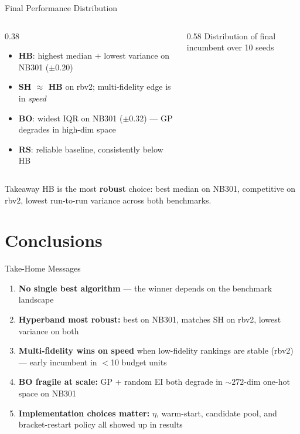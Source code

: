 \documentclass[t,english]{beamer}
\begin{document}
\begin{frame}{Final Performance Distribution}
  \begin{columns}[T]
    \begin{column}{0.38\textwidth}
      \begin{itemize}\setlength\itemsep{4pt}
        \item[\small$\blacktriangleright$] {\scriptsize\textbf{HB}: highest median + lowest variance on NB301 ($\pm 0.20$)}
        \item[\small$\blacktriangleright$] {\scriptsize\textbf{SH $\approx$ HB} on rbv2; multi-fidelity edge is in \emph{speed}}
        \item[\small$\blacktriangleright$] {\scriptsize\textbf{BO}: widest IQR on NB301 ($\pm 0.32$) — GP degrades in high-dim space}
        \item[\small$\blacktriangleright$] {\scriptsize\textbf{RS}: reliable baseline, consistently below HB}
      \end{itemize}
    \end{column}
    \begin{column}{0.58\textwidth}
      \vskip-8pt
      {\tiny Distribution of final incumbent over 10 seeds}
    \end{column}
  \end{columns}
  \vspace{0.3em}
  \begin{alertblock}{Takeaway}
    \small HB is the most \textbf{robust} choice: best median on NB301,
    competitive on rbv2, lowest run-to-run variance across both benchmarks.
  \end{alertblock}
\end{frame}

\section{Conclusions}

\begin{frame}{Take-Home Messages}
  \small
  \begin{enumerate}[<+->]\setlength\itemsep{5pt}
    \item \textbf{No single best algorithm} — the winner depends on the
          benchmark landscape
    \item \textbf{Hyperband most robust:} best on NB301, matches SH on rbv2,
          lowest variance on both
    \item \textbf{Multi-fidelity wins on speed} when low-fidelity rankings
          are stable (rbv2) — early incumbent in $<$10 budget units
    \item \textbf{BO fragile at scale:} GP + random EI both degrade in
          ${\sim}272$-dim one-hot space on NB301
    \item \textbf{Implementation choices matter:} $\eta$, warm-start,
          candidate pool, and bracket-restart policy all showed up in results
  \end{enumerate}
\end{frame}
\end{document}
